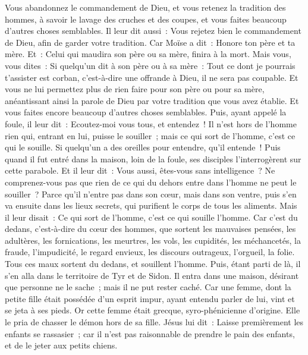 \begin{multicols}{2}
Vous abandonnez le commandement de Dieu, et vous retenez la tradition des hommes, à savoir le lavage des cruches et des coupes, et vous faites beaucoup d'autres choses semblables.
Il leur dit aussi~: Vous rejetez bien le commandement de Dieu, afin de garder votre tradition.
Car Moïse a dit~: Honore ton père et ta mère. Et~: Celui qui maudira son père ou sa mère, finira à la mort.
Mais vous, vous dites~: Si quelqu'un dit à son père ou à sa mère~: Tout ce dont je pourrais t'assister est corban, c'est-à-dire une offrande à Dieu, il ne sera pas coupable.
Et vous ne lui permettez plus de rien faire pour son père ou pour sa mère,
anéantissant ainsi la parole de Dieu par votre tradition que vous avez établie. Et vous faites encore beaucoup d'autres choses semblables.
Puis, ayant appelé la foule, il leur dit~: Ecoutez-moi vous tous, et entendez~!
Il n'est hors de l'homme rien qui, entrant en lui, puisse le souiller~; mais ce qui sort de l'homme, c'est ce qui le souille.
Si quelqu'un a des oreilles pour entendre, qu'il entende~!
Puis quand il fut entré dans la maison, loin de la foule, ses disciples l'interrogèrent sur cette parabole.
Et il leur dit~: Vous aussi, êtes-vous sans intelligence~? Ne comprenez-vous pas que rien de ce qui du dehors entre dans l'homme ne peut le souiller~?
Parce qu'il n'entre pas dans son cœur, mais dans son ventre, puis s'en va ensuite dans les lieux secrets, qui purifient le corps de tous les aliments.
Mais il leur disait~: Ce qui sort de l'homme, c'est ce qui souille l'homme.
Car c'est du dedans, c'est-à-dire du cœur des hommes, que sortent les mauvaises pensées, les adultères, les fornications, les meurtres,
les vols, les cupidités, les méchancetés, la fraude, l'impudicité, le regard envieux, les discours outrageux, l'orgueil, la folie.
Tous ces maux sortent du dedans, et souillent l'homme.
Puis, étant parti de là, il s'en alla dans le territoire de Tyr et de Sidon. Il entra dans une maison, désirant que personne ne le sache~; mais il ne put rester caché.
Car une femme, dont la petite fille était possédée d'un esprit impur, ayant entendu parler de lui, vint et se jeta à ses pieds.
Or cette femme était grecque, syro-phénicienne d'origine. Elle le pria de chasser le démon hors de sa fille. Jésus lui dit~:
Laisse premièrement les enfants se rassasier~; car il n'est pas raisonnable de prendre le pain des enfants, et de le jeter aux petits chiens.

\end{multicols}
